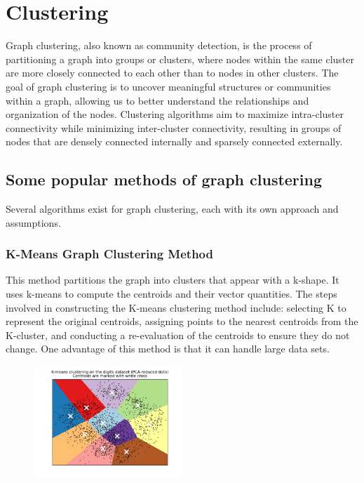 \documentclass[12pt, a4paper]{article}
\begin{document}
    \section{Clustering}
    \begin{flushleft}
        Graph clustering, also known as community detection, is the process of partitioning a graph into groups or clusters, where nodes within the same cluster are more closely connected to each other than to nodes in other clusters. The goal of graph clustering is to uncover meaningful structures or communities within a graph, allowing us to better understand the relationships and organization of the nodes. Clustering algorithms aim to maximize intra-cluster connectivity while minimizing inter-cluster connectivity, resulting in groups of nodes that are densely connected internally and sparsely connected externally.
        
        
        \subsection{Some popular methods of graph clustering \cite{Wong23}}
        Several algorithms exist for graph clustering, each with its own approach and assumptions.
        \subsubsection{K-Means Graph Clustering Method \cite{Tuzsus22}}
        \begin{flushleft}
            This method partitions the graph into clusters that appear with a k-shape. It uses k-means to compute the centroids and their vector quantities. The steps involved in constructing the K-means clustering method include: selecting K to represent the original centroids, assigning points to the nearest centroids from the K-cluster, and conducting a re-evaluation of the centroids to ensure they do not change. One advantage of this method is that it can handle large data sets.

            \begin{figure}[h]
            \centering
            \includegraphics[width=0.5\textwidth]{k-means_based.png}
            \end{figure}
        \end{flushleft}


\end{flushleft}
\end{document}
